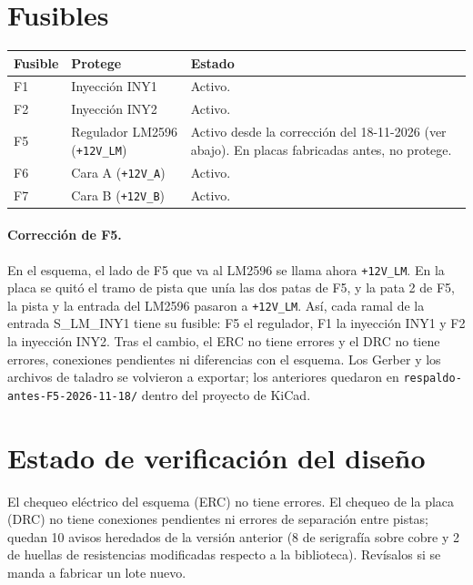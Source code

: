 \section{Fusibles}

\begin{tabularx}{\linewidth}{@{}l l X@{}}
\toprule
\textbf{Fusible} & \textbf{Protege} & \textbf{Estado} \\ \midrule
F1 & Inyección INY1 & Activo. \\
F2 & Inyección INY2 & Activo. \\
F5 & Regulador LM2596 (\texttt{+12V\_LM}) & Activo desde la corrección del 18-11-2026 (ver abajo). En placas fabricadas antes, no protege. \\
F6 & Cara A (\texttt{+12V\_A}) & Activo. \\
F7 & Cara B (\texttt{+12V\_B}) & Activo. \\
\bottomrule
\end{tabularx}


\paragraph{Corrección de F5.} En el esquema, el lado de F5 que va al LM2596 se llama ahora \texttt{+12V\_LM}. En la placa se quitó el tramo de pista que unía las dos patas de F5, y la pata 2 de F5, la pista y la entrada del LM2596 pasaron a \texttt{+12V\_LM}. Así, cada ramal de la entrada S\_LM\_INY1 tiene su fusible: F5 el regulador, F1 la inyección INY1 y F2 la inyección INY2. Tras el cambio, el ERC no tiene errores y el DRC no tiene errores, conexiones pendientes ni diferencias con el esquema. Los Gerber y los archivos de taladro se volvieron a exportar; los anteriores quedaron en \texttt{respaldo-antes-F5-2026-11-18/} dentro del proyecto de KiCad.


\section{Estado de verificación del diseño}

El chequeo eléctrico del esquema (ERC) no tiene errores. El chequeo de la placa (DRC) no tiene conexiones pendientes ni errores de separación entre pistas; quedan 10 avisos heredados de la versión anterior (8 de serigrafía sobre cobre y 2 de huellas de resistencias modificadas respecto a la biblioteca). Revísalos si se manda a fabricar un lote nuevo.
